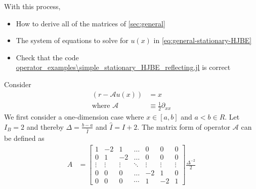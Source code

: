 \documentclass[11pt]{article}
\newcommand{\A}{\ensuremath{\mathcal{A}}}
\begin{document}
With this process,
\begin{itemize}
	\item How to derive all of the matrices of \cref{sec:general}
	\item The system of equations to solve for $u(x)$ in \cref{eq:general-stationary-HJBE}
	\item Check that the code \url{operator_examples\simple_stationary_HJBE_reflecting.jl} is correct
\end{itemize}
Consider
\begin{align}
(r- \A u(x)) &= x\label{HJBE_reflecting_barriers_PDE}\\
\text{where }\A&\equiv \frac{1}{2}\partial_{xx}
\end{align}
We first consider a one-dimension case where $x\in [a, b]$ and $a<b\in R$. Let $I_B = 2$ and thereby $\Delta  = \frac{b-a}{\hat{I}}$ and $\hat{I} = I+2$. The matrix form of operator $\A$ can be defined as
\begin{align}
A &= \begin{bmatrix}
1&-2&1&\dots&0&0&0\\
0&1&-2&\dots&0&0&0\\
\vdots&\vdots&\vdots&\ddots&\vdots&\vdots&\vdots\\
0&0&0&\dots&-2&1&0\\
0&0&0&\cdots&1&-2&1
\end{bmatrix}\frac{\Delta^{-2}}{2}\nonumber
\end{align}
\end{document}
